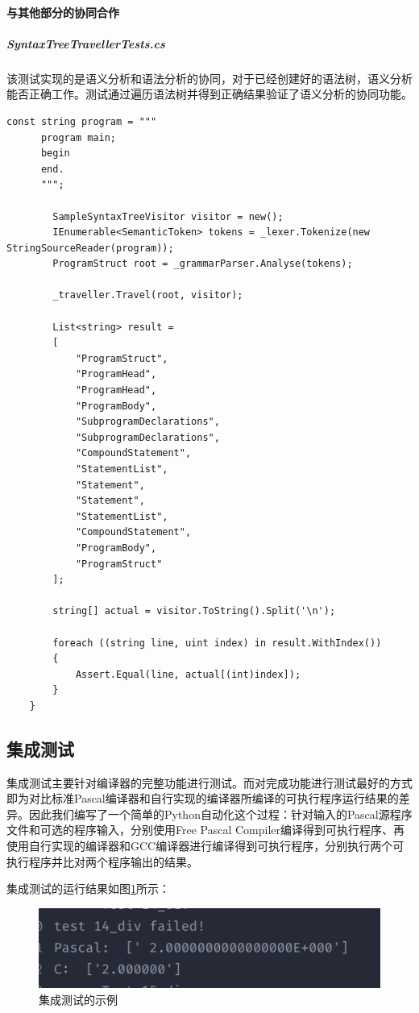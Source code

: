 \documentclass[../main.tex]{subfiles}
\begin{document}
\paragraph{与其他部分的协同合作}

\subparagraph{SyntaxTreeTravellerTests.cs}
该测试实现的是语义分析和语法分析的协同，对于已经创建好的语法树，语义分析能否正确工作。测试通过遍历语法树并得到正确结果验证了语义分析的协同功能。

\begin{lstlisting}[style =csharp]
const string program = """
      program main;
      begin
      end.
      """;

        SampleSyntaxTreeVisitor visitor = new();
        IEnumerable<SemanticToken> tokens = _lexer.Tokenize(new StringSourceReader(program));
        ProgramStruct root = _grammarParser.Analyse(tokens);

        _traveller.Travel(root, visitor);

        List<string> result =
        [
            "ProgramStruct",
            "ProgramHead",
            "ProgramHead",
            "ProgramBody",
            "SubprogramDeclarations",
            "SubprogramDeclarations",
            "CompoundStatement",
            "StatementList",
            "Statement",
            "Statement",
            "StatementList",
            "CompoundStatement",
            "ProgramBody",
            "ProgramStruct"
        ];

        string[] actual = visitor.ToString().Split('\n');

        foreach ((string line, uint index) in result.WithIndex())
        {
            Assert.Equal(line, actual[(int)index]);
        }
    }
\end{lstlisting}

\subsection{集成测试}

集成测试主要针对编译器的完整功能进行测试。而对完成功能进行测试最好的方式即为对比标准Pascal编译器和自行实现的编译器所编译的可执行程序运行结果的差异。因此我们编写了一个简单的Python自动化这个过程：针对输入的Pascal源程序文件和可选的程序输入，分别使用Free Pascal Compiler编译得到可执行程序、再使用自行实现的编译器和GCC编译器进行编译得到可执行程序，分别执行两个可执行程序并比对两个程序输出的结果。

集成测试的运行结果如图\ref{fig:integrated_test_figure}所示：

\begin{figure}
    \centering
    \includegraphics[width=0.5\linewidth]{assets/集成测试示例.png}
    \caption{集成测试的示例}
    \label{fig:integrated_test_figure}
\end{figure}
\end{document}
